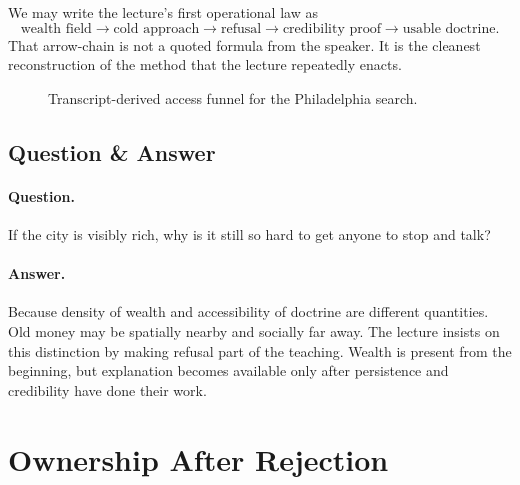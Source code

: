 We may write the lecture's first operational law as
\begin{equation}
\text{wealth field} \to \text{cold approach} \to \text{refusal} \to \text{credibility proof} \to \text{usable doctrine}.
\end{equation}
That arrow-chain is not a quoted formula from the speaker. It is the cleanest reconstruction of the method that the lecture repeatedly enacts.

\begin{figure}[h]
\centering
{}
\caption{Transcript-derived access funnel for the Philadelphia search.}
\end{figure}

\subsection{Question \& Answer}

\paragraph{Question.} If the city is visibly rich, why is it still so hard to get anyone to stop and talk?

\paragraph{Answer.} Because density of wealth and accessibility of doctrine are different quantities. Old money may be spatially nearby and socially far away. The lecture insists on this distinction by making refusal part of the teaching. Wealth is present from the beginning, but explanation becomes available only after persistence and credibility have done their work.

\section{Ownership After Rejection}

